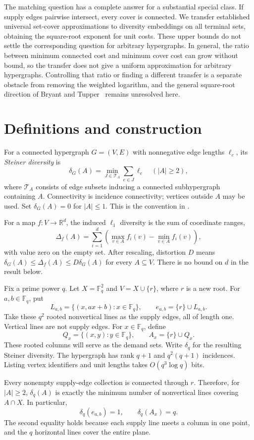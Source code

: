 \documentclass[11pt]{article}
\newcommand{\F}{\mathbb F}
\begin{document}
The matching question has a complete answer for a substantial special
class. If supply edges pairwise intersect, every cover is connected.
We transfer established universal set-cover approximations to diversity
embeddings on all terminal sets, obtaining the square-root exponent for
unit costs. These upper bounds do not settle the corresponding question
for arbitrary hypergraphs. In general, the ratio between minimum connected
cost and minimum cover cost can grow without bound, so the transfer does
not give a uniform approximation for arbitrary hypergraphs. Controlling
that ratio or finding a different transfer is a separate obstacle from
removing the weighted logarithm, and the general square-root direction
of Bryant and Tupper~\cite{BT17} remains unresolved here.


\section{Definitions and construction}
For a connected hypergraph $G=(V,E)$ with nonnegative edge lengths $\ell_e$,
its \emph{Steiner diversity} is
\[
 \delta_G(A)=\min_{J\in\mathcal T_A}\sum_{e\in J}\ell_e
 \quad (|A|\ge2),
\]
where $\mathcal T_A$ consists of edge subsets inducing a connected
subhypergraph containing $A$. Connectivity is incidence connectivity;
vertices outside $A$ may be used. Set $\delta_G(A)=0$ for $|A|\le1$.
This is the convention in \cite[Definition 1.6]{JS}.

For a map $f:V\to\mathbb R^d$, the induced $\ell_1$ diversity is the
sum of coordinate ranges,
\[
 \Delta_f(A)=\sum_{i=1}^d
 \left(\max_{v\in A}f_i(v)-\min_{v\in A}f_i(v)\right),
\]
with value zero on the empty set. After rescaling, distortion $D$ means
$\delta_G(A)\le\Delta_f(A)\le D\delta_G(A)$ for every $A\subseteq V$.
There is no bound on $d$ in the result below.

Fix a prime power $q$. Let $X=\F_q^2$ and $V=X\cup\{r\}$, where $r$ is a new
root. For $a,b\in\F_q$, put
\[
 L_{a,b}=\{(x,ax+b):x\in\F_q\},\qquad e_{a,b}=\{r\}\cup L_{a,b}.
\]
Take these $q^2$ rooted nonvertical lines as the supply edges, all of length
one. Vertical lines are not supply edges. For $x\in\F_q$, define
\[
 Q_x=\{(x,y):y\in\F_q\},\qquad A_x=\{r\}\cup Q_x.
\]
These rooted columns will serve as the demand sets. Write $\delta_q$ for
the resulting Steiner diversity. The hypergraph has rank $q+1$ and
$q^2(q+1)$ incidences. Listing vertex identifiers and unit lengths takes
$O(q^3\log q)$ bits.

Every nonempty supply-edge collection is connected through $r$. Therefore,
for $|A|\ge2$, $\delta_q(A)$ is exactly the minimum number of nonvertical
lines covering $A\cap X$. In particular,
\begin{equation}\label{eq:costs}
 \delta_q(e_{a,b})=1,\qquad \delta_q(A_x)=q.
\end{equation}
The second equality holds because each supply line meets a column in one
point, and the $q$ horizontal lines cover the entire plane.
\end{document}
